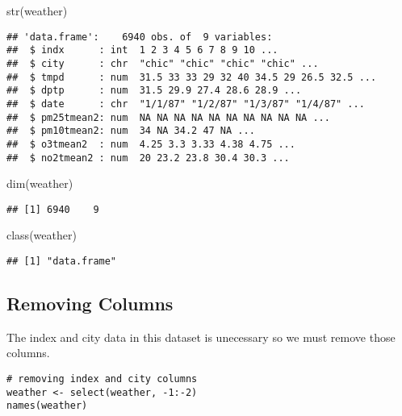 \documentclass[
]{article}
\newenvironment{Shaded}{\begin{snugshade}}{\end{snugshade}}
\newcommand{\FunctionTok}[1]{\textcolor[rgb]{0.00,0.00,0.00}{#1}}
\newcommand{\NormalTok}[1]{#1}
\begin{document}
\begin{Shaded}
\begin{Highlighting}[]
\FunctionTok{str}\NormalTok{(weather)}
\end{Highlighting}
\end{Shaded}

\begin{verbatim}
## 'data.frame':    6940 obs. of  9 variables:
##  $ indx      : int  1 2 3 4 5 6 7 8 9 10 ...
##  $ city      : chr  "chic" "chic" "chic" "chic" ...
##  $ tmpd      : num  31.5 33 33 29 32 40 34.5 29 26.5 32.5 ...
##  $ dptp      : num  31.5 29.9 27.4 28.6 28.9 ...
##  $ date      : chr  "1/1/87" "1/2/87" "1/3/87" "1/4/87" ...
##  $ pm25tmean2: num  NA NA NA NA NA NA NA NA NA NA ...
##  $ pm10tmean2: num  34 NA 34.2 47 NA ...
##  $ o3tmean2  : num  4.25 3.3 3.33 4.38 4.75 ...
##  $ no2tmean2 : num  20 23.2 23.8 30.4 30.3 ...
\end{verbatim}

\begin{Shaded}
\begin{Highlighting}[]
\FunctionTok{dim}\NormalTok{(weather)}
\end{Highlighting}
\end{Shaded}

\begin{verbatim}
## [1] 6940    9
\end{verbatim}

\begin{Shaded}
\begin{Highlighting}[]
\FunctionTok{class}\NormalTok{(weather)}
\end{Highlighting}
\end{Shaded}

\begin{verbatim}
## [1] "data.frame"
\end{verbatim}

\hypertarget{removing-columns}{%
\subsection{Removing Columns}\label{removing-columns}}

The index and city data in this dataset is unecessary so we must remove
those columns.

\begin{verbatim}
# removing index and city columns
weather <- select(weather, -1:-2)
names(weather)
\end{verbatim}
\end{document}
